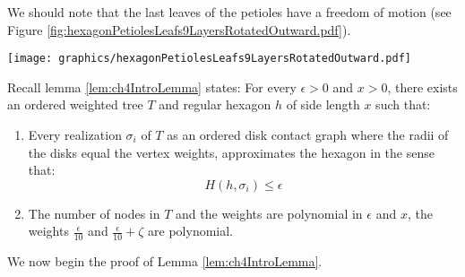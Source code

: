 \documentclass[10pt]{CSUNthesis}
\theoremstyle{plain}%
\theoremstyle{definition}
\theoremstyle{remark}
\newcommand{\lr}[1]{\left( #1 \right)}
\begin{document}
We should note that the last leaves of the petioles have a freedom of motion (see Figure \ref{fig:hexagonPetiolesLeafs9LayersRotatedOutward.pdf}).  

\begin{minipage}{\linewidth}
\begin{center}
\texttt{[image: graphics/hexagonPetiolesLeafs9LayersRotatedOutward.pdf]}
\label{fig:hexagonPetiolesLeafs9LayersRotatedOutward.pdf}
\end{center}
\end{minipage}

Recall lemma \ref{lem:ch4IntroLemma} states:\newline
For every $\epsilon > 0$ and $x>0$, there exists an ordered weighted tree $T$ and regular hexagon $h$ of side length $x$ such that:
\begin{enumerate}
\item Every realization $\sigma_i$ of $T$ as an ordered disk contact graph where the radii of the disks equal the vertex weights, approximates the hexagon in the sense that:
$$H\lr{h,\sigma_i}\leq\epsilon$$
\item The number of nodes in $T$ and the weights are polynomial in $\epsilon$ and $x$, the weights $\frac{\epsilon}{10}$ and $\frac{\epsilon}{10} + \zeta$ are polynomial.
\end{enumerate}
We now begin the proof of Lemma \ref{lem:ch4IntroLemma}.
\end{document}

